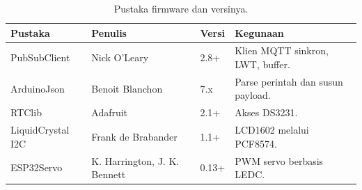 \begin{table}[H]
\centering
\caption{Pustaka firmware dan versinya.}
\label{tab:04-pustaka}
\small
\begin{tabular}{@{}p{4.4cm}p{4.6cm}p{1.6cm}p{3.7cm}@{}}
\toprule
\textbf{Pustaka} & \textbf{Penulis} & \textbf{Versi} & \textbf{Kegunaan} \\
\midrule
PubSubClient & Nick O'Leary & 2.8+ & Klien MQTT sinkron, LWT, buffer. \\
ArduinoJson & Benoit Blanchon & 7.x & Parse perintah dan susun payload. \\
RTClib & Adafruit & 2.1+ & Akses DS3231. \\
LiquidCrystal I2C & Frank de Brabander & 1.1+ & LCD1602 melalui PCF8574. \\
ESP32Servo & K. Harrington, J. K. Bennett & 0.13+ & PWM servo berbasis LEDC. \\
\bottomrule
\end{tabular}
\end{table}

